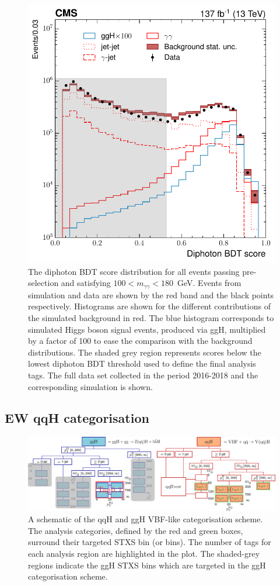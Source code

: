 \begin{figure}
  \centering
  \includegraphics[width=.5\textwidth]{Figures/hgg_overview/DiphoBDT_dipho_mva_logPlot_noStack.pdf}
  \caption[Diphoton BDT output score]
  {
    The diphoton BDT score distribution for all events passing pre-selection and satisfying $100<m_{\gamma\gamma}<180$~GeV. Events from simulation and data are shown by the red band and the black points respectively. Histograms are shown for the different contributions of the simulated background in red. The blue histogram corresponds to simulated Higgs boson signal events, produced via ggH, multiplied by a factor of 100 to ease the comparison with the background distributions. The shaded grey region represents scores below the lowest diphoton BDT threshold used to define the final analysis tags. The full data set collected in the period 2016-2018 and the corresponding simulation is shown.
  }
  \label{fig:diphoton_score}
\end{figure}

\subsection{EW qqH categorisation}\label{sec:qqH_categorisation}
\begin{figure}
  \centering
  \includegraphics[width=1\textwidth]{Figures/hgg_overview/categorisation_schematics/qqHCategorisation.pdf}
  \caption[qqH and ggH VBF-like categorisation schematic]
  {
    A schematic of the qqH and ggH VBF-like categorisation scheme. The analysis categories, defined by the red and green boxes, surround their targeted STXS bin (or bins). The number of tags for each analysis region are highlighted in the plot. The shaded-grey regions indicate the ggH STXS bins which are targeted in the ggH categorisation scheme.
  }
  \label{fig:qqH_categorisation_schematic}
\end{figure}

